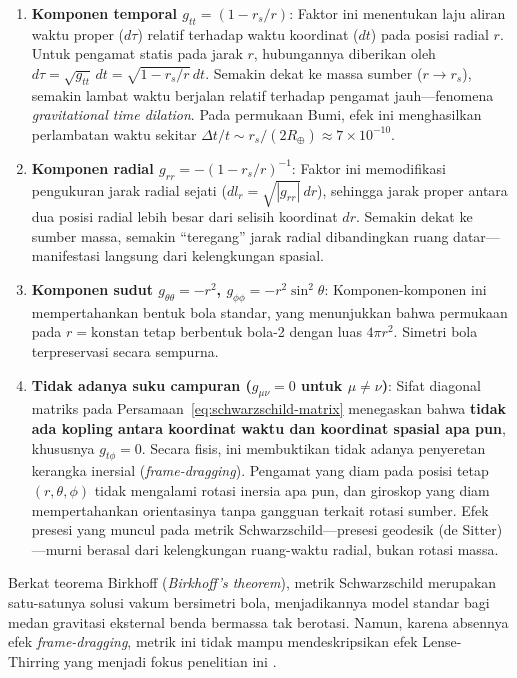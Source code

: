 \begin{enumerate}[label=(\alph*), wide=0pt, leftmargin=*]
    \item \textbf{Komponen temporal $g_{tt} = (1 - r_s/r)$}: Faktor ini menentukan laju aliran waktu proper ($d\tau$) relatif terhadap waktu koordinat ($dt$) pada posisi radial $r$. Untuk pengamat statis pada jarak $r$, hubungannya diberikan oleh $d\tau = \sqrt{g_{tt}}\,dt = \sqrt{1 - r_s/r}\, dt$. Semakin dekat ke massa sumber ($r \to r_s$), semakin lambat waktu berjalan relatif terhadap pengamat jauh---fenomena \textit{gravitational time dilation}. Pada permukaan Bumi, efek ini menghasilkan perlambatan waktu sekitar $\Delta t/t \sim r_s/(2R_\oplus) \approx 7 \times 10^{-10}$.

    \item \textbf{Komponen radial $g_{rr} = -(1 - r_s/r)^{-1}$}: Faktor ini memodifikasi pengukuran jarak radial sejati ($dl_r = \sqrt{|g_{rr}|}\,dr$), sehingga jarak proper antara dua posisi radial lebih besar dari selisih koordinat $dr$. Semakin dekat ke sumber massa, semakin ``teregang'' jarak radial dibandingkan ruang datar---manifestasi langsung dari kelengkungan spasial.

    \item \textbf{Komponen sudut $g_{\theta\theta} = -r^2$, $g_{\phi\phi} = -r^2\sin^2\theta$}: Komponen-komponen ini mempertahankan bentuk bola standar, yang menunjukkan bahwa permukaan pada $r = \text{konstan}$ tetap berbentuk bola-2 dengan luas $4\pi r^2$. Simetri bola terpreservasi secara sempurna.

    \item \textbf{Tidak adanya suku campuran ($g_{\mu\nu} = 0$ untuk $\mu \neq \nu$)}: Sifat diagonal matriks pada Persamaan~\eqref{eq:schwarzschild-matrix} menegaskan bahwa \textbf{tidak ada kopling antara koordinat waktu dan koordinat spasial apa pun}, khususnya $g_{t\phi} = 0$. Secara fisis, ini membuktikan tidak adanya penyeretan kerangka inersial (\textit{frame-dragging}). Pengamat yang diam pada posisi tetap $(r, \theta, \phi)$ tidak mengalami rotasi inersia apa pun, dan giroskop yang diam mempertahankan orientasinya tanpa gangguan terkait rotasi sumber. Efek presesi yang muncul pada metrik Schwarzschild---presesi geodesik (de Sitter)---murni berasal dari kelengkungan ruang-waktu radial, bukan rotasi massa.
\end{enumerate}

Berkat teorema Birkhoff (\textit{Birkhoff's theorem}), metrik Schwarzschild merupakan satu-satunya solusi vakum bersimetri bola, menjadikannya model standar bagi medan gravitasi eksternal benda bermassa tak berotasi. Namun, karena absennya efek \textit{frame-dragging}, metrik ini tidak mampu mendeskripsikan efek Lense-Thirring yang menjadi fokus penelitian ini \parencite{Carroll2004SpacetimeGeometry, Hartle2003Gravity}.


